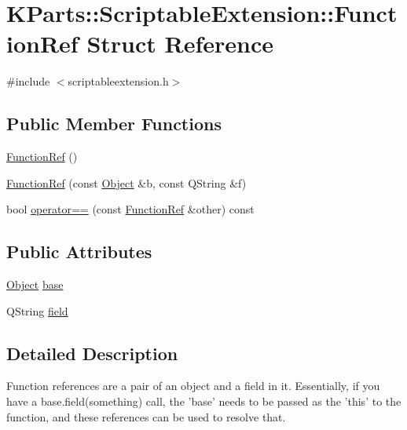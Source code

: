 \hypertarget{structKParts_1_1ScriptableExtension_1_1FunctionRef}{\section{K\+Parts\+:\+:Scriptable\+Extension\+:\+:Function\+Ref Struct Reference}
\label{structKParts_1_1ScriptableExtension_1_1FunctionRef}
}


{\ttfamily \#include $<$scriptableextension.\+h$>$}

\subsection*{Public Member Functions}
\begin{DoxyCompactItemize}
\item 
\hyperlink{structKParts_1_1ScriptableExtension_1_1FunctionRef_a86b2595b7fdf73a3bc128b295792f3da}{Function\+Ref} ()
\item 
\hyperlink{structKParts_1_1ScriptableExtension_1_1FunctionRef_a0349d019315c9ec43aa75c91c184b500}{Function\+Ref} (const \hyperlink{structKParts_1_1ScriptableExtension_1_1Object}{Object} \&b, const Q\+String \&f)
\item 
bool \hyperlink{structKParts_1_1ScriptableExtension_1_1FunctionRef_a97f50a9c52fb32ae83cfc07768866c9d}{operator==} (const \hyperlink{structKParts_1_1ScriptableExtension_1_1FunctionRef}{Function\+Ref} \&other) const 
\end{DoxyCompactItemize}
\subsection*{Public Attributes}
\begin{DoxyCompactItemize}
\item 
\hyperlink{structKParts_1_1ScriptableExtension_1_1Object}{Object} \hyperlink{structKParts_1_1ScriptableExtension_1_1FunctionRef_aefa54e151818239bce80641973c79e18}{base}
\item 
Q\+String \hyperlink{structKParts_1_1ScriptableExtension_1_1FunctionRef_a1e3cffbdcfde393b9ff6243080edbbd4}{field}
\end{DoxyCompactItemize}


\subsection{Detailed Description}
Function references are a pair of an object and a field in it. Essentially, if you have a base.\+field(something) call, the 'base' needs to be passed as the 'this' to the function, and these references can be used to resolve that. 

